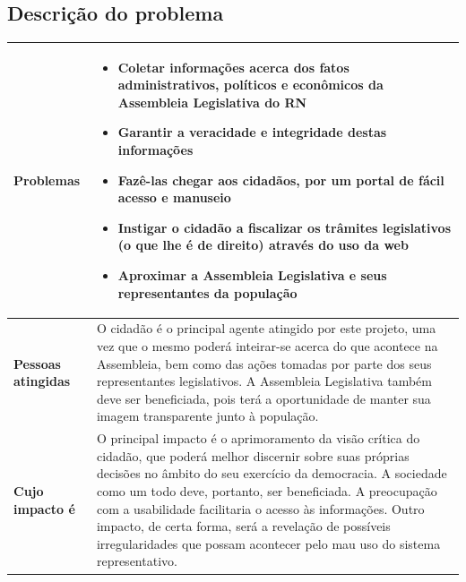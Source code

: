 \documentclass[12pt, a4paper]{article}
\begin{document}
        \subsection{Descrição do problema}
            \begin{longtabu}{X[-1] | X}
                \hline

                \textbf{Problemas} &
                \begin{minipage}[t]{\linewidth}
                \begin{itemize}[itemsep=.5ex,parsep=.0ex,after=\strut]
                \item Coletar informações acerca dos fatos administrativos,
                    políticos e econômicos da Assembleia Legislativa do RN
                \item Garantir a veracidade e integridade destas informações
                \item Fazê-las chegar aos cidadãos, por um portal de fácil acesso
                    e manuseio
                \item Instigar o cidadão a fiscalizar os trâmites legislativos
                    (o que lhe é de direito) através do uso da web
                \item Aproximar a Assembleia Legislativa e seus representantes
                    da população
                \end{itemize}
                \end{minipage}
                \\ \hline

                \textbf{Pessoas atingidas} &
                O cidadão é o principal agente atingido por este projeto, uma
                vez que o mesmo poderá inteirar-se acerca do que acontece na
                Assembleia, bem como das ações tomadas por parte dos seus
                representantes legislativos. A Assembleia Legislativa também
                deve ser beneficiada, pois terá a oportunidade de manter sua
                imagem transparente junto à população.
                \\ \hline

                \textbf{Cujo impacto é} &
                O principal impacto é o aprimoramento da visão crítica do
                cidadão, que poderá melhor discernir sobre suas próprias
                decisões no âmbito do seu exercício da democracia. A sociedade
                como um todo deve, portanto, ser beneficiada. A preocupação com
                a usabilidade facilitaria o acesso às informações.  Outro
                impacto, de certa forma, será a revelação de possíveis
                irregularidades que possam acontecer pelo mau uso do sistema
                representativo.
                \\ \hline


\end{longtabu}
\end{document}
